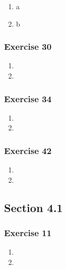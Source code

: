 \documentclass[a4paper]{article}
\newcommand{\ex}[1]{\subsubsection*{#1}}
\begin{document}
\begin{enumerate}[label=\alph*)]
    \item a

    \item b
\end{enumerate}


\ex{Exercise 30} %

\begin{enumerate}[label=\alph*)]
    \item

    \item
\end{enumerate}


\ex{Exercise 34}

\begin{enumerate}[label=\alph*)]
    \item

    \item
\end{enumerate}


\ex{Exercise 42}

\begin{enumerate}[label=\alph*)]
    \item

    \item
\end{enumerate}


\subsection*{Section 4.1}
\ex{Exercise 11}

\begin{enumerate}[label=\alph*)]
    \item

    \item
\end{enumerate}



%
\end{document}
